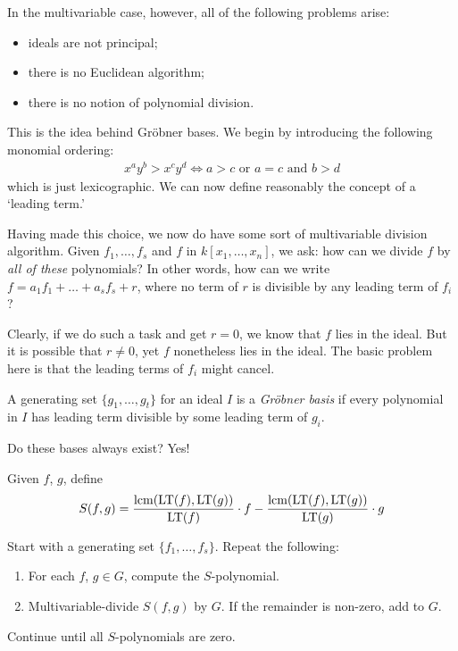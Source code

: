 \documentclass{../../template/note}
\begin{document}
    In the multivariable case, however, all of the following problems arise:
    \begin{itemize}
        \item ideals are not principal;
        \item there is no Euclidean algorithm;
        \item there is no notion of polynomial division.
    \end{itemize}

    This is the idea behind Gr\"obner bases. We begin by introducing the following monomial ordering:
    \begin{align*}
        x^ay^b > x^cy^d \iff a>c \text{ or } a = c \text{ and } b > d
    \end{align*}
    which is just lexicographic. We can now define reasonably the concept of a `leading term.'
    
    Having made this choice, we now do have some sort of multivariable division algorithm. Given $f_1, \dots, f_s$ and $f$ in $k[x_1, \dots, x_n]$, we ask: how can we divide $f$ by \emph{all of these} polynomials? In other words, how can we write $f = a_1f_1 + \dots + a_sf_s + r$, where no term of $r$ is divisible by any leading term of $f_i$?

    Clearly, if we do such a task and get $r=0$, we know that $f$ lies in the ideal. But it is possible that $r \neq 0$, yet $f$ nonetheless lies in the ideal. The basic problem here is that the leading terms of $f_i$ might cancel.

    \begin{definition}
        A generating set $\{g_1, \dots, g_t\}$ for an ideal $I$ is a \emph{Gr\"obner basis} if every polynomial in $I$ has leading term divisible by some leading term of $g_i$.
    \end{definition}
    
    Do these bases always exist? Yes!

    Given $f$, $g$, define
    \begin{align*}
        S(f, g) = \frac{\operatorname*{lcm}(\operatorname{LT}(f), \operatorname{LT}(g))}{\operatorname{LT}(f)} \cdot f - \frac{\operatorname*{lcm}(\operatorname{LT}(f), \operatorname{LT}(g))}{\operatorname{LT}(g)} \cdot g 
    \end{align*}
    
    
    \begin{algorithm}
        Start with a generating set $\{f_1, \dots, f_s\}$. Repeat the following:
        \begin{enumerate}[label=\protect\circled{\arabic*}]
            \item For each $f$, $g \in G$, compute the $S$-polynomial.
            \item Multivariable-divide $S(f, g)$ by $G$. If the remainder is non-zero, add to $G$.
        \end{enumerate}
        Continue until all $S$-polynomials are zero.        
    \end{algorithm}
    
\end{document}
